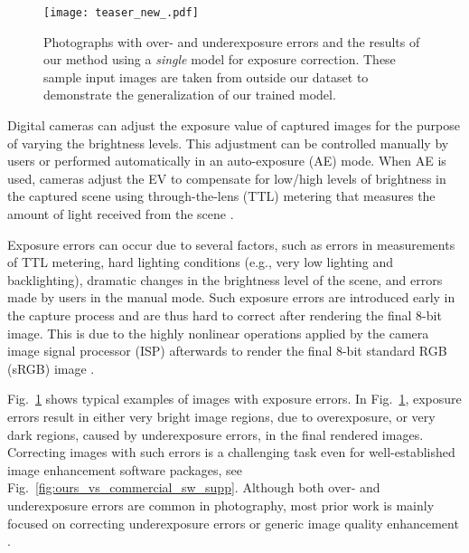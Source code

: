 \documentclass[final]{cvpr}
\begin{document}
\begin{figure}[t]
\centering
\texttt{[image: teaser\_new\_.pdf]}
\vspace{-6mm}
\caption{Photographs with over- and underexposure errors and the results of our method using a \textit{single} model for exposure correction. These sample input images are taken from outside our dataset to demonstrate the generalization of our trained model.\vspace{-4mm}}
\label{fig:teaser}
\end{figure}

Digital cameras can adjust the exposure value of captured images for the purpose of varying the brightness levels. This adjustment can be controlled manually by users or performed automatically in an auto-exposure (AE) mode. When AE is used, cameras adjust the EV to compensate for low/high levels of brightness in the captured scene using through-the-lens (TTL) metering that measures the amount of light received from the scene \cite{peterson2016understanding}.

Exposure errors can occur due to several factors, such as errors in measurements of TTL metering, hard lighting conditions (e.g., very low lighting and backlighting), dramatic changes in the brightness level of the scene, and errors made by users in the manual mode. Such exposure errors are introduced early in the capture process and are thus hard to correct after rendering the final 8-bit image. This is due to the highly nonlinear operations applied by the camera image signal processor (ISP) afterwards to render the final 8-bit standard RGB (sRGB) image \cite{karaimer2016software}.

Fig.\ \ref{fig:teaser} shows typical examples of images with exposure errors. In Fig.\ \ref{fig:teaser}, exposure errors result in either very bright image regions, due to overexposure, or very dark regions, caused by underexposure errors, in the final rendered images. Correcting images with such errors is a challenging task even for well-established image enhancement software packages, see Fig.\ \ref{fig:ours_vs_commercial_sw_supp}. Although both over- and underexposure errors are common in photography, most prior work is mainly focused on correcting underexposure errors \cite{guo2017lime, HQEC, Chen2018Retinex, zhang2019kindling, DeepUPE} or generic image quality enhancement \cite{HDRNET, DPE}.
\end{document}
